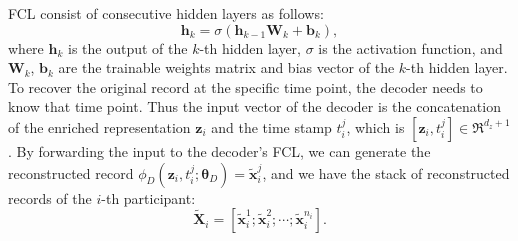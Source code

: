 FCL consist of consecutive hidden layers as follows:
\begin{equation}
    \mathbf{h}_k = \sigma(\mathbf{h}_{k-1} \mathbf{W}_k + \mathbf{b}_k),
\end{equation}
where $\mathbf{h}_k$ is the output of the $k$-th hidden layer, $\sigma$ is the activation function, and $\mathbf{W}_k$, $\mathbf{b}_k$ are the trainable weights matrix and bias vector of the $k$-th hidden layer. To recover the original record at the specific time point, the decoder needs to know that time point. Thus the input vector of the decoder is the concatenation of the enriched representation $\mathbf{z}_i$ and the time stamp $t^j_i$, which is $[\mathbf{z}_i, t_i^j] \in \Re^{d_z + 1}$.  By forwarding the input to the decoder's FCL, we can generate the reconstructed record $\phi_D(\mathbf{z}_i, t_i^j; \mathbf{\theta}_D) = \tilde{\mathbf{x}}_i^j$, and we have the stack of reconstructed records of the $i$-th participant:
\begin{equation}
    \tilde{\mathbf{X}}_i = [\tilde{\mathbf{x}}_i^1; \tilde{\mathbf{x}}_i^2; \cdots; \tilde{\mathbf{x}}_i^{n_i}].
\end{equation}

